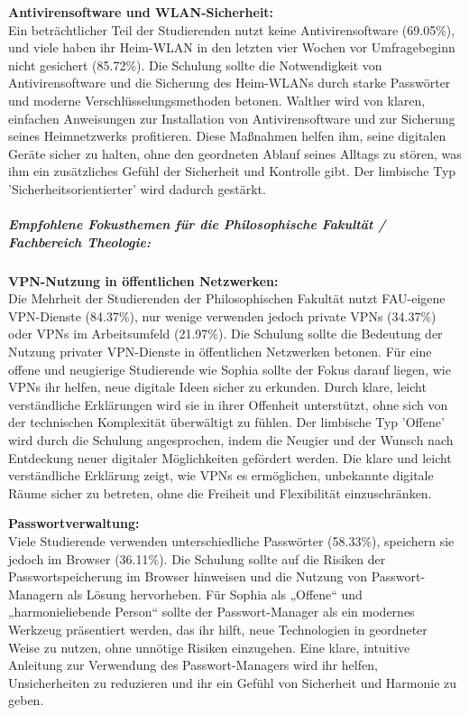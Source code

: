 \documentclass[german,report]{i1thesis}
\begin{document}
\textbf{Antivirensoftware und WLAN-Sicherheit:}\\
Ein beträchtlicher Teil der Studierenden nutzt keine Antivirensoftware (69.05\%), und viele haben ihr Heim-WLAN in den letzten vier Wochen vor Umfragebeginn nicht gesichert (85.72\%). Die Schulung sollte die Notwendigkeit von Antivirensoftware und die Sicherung des Heim-WLANs durch starke Passwörter und moderne Verschlüsselungsmethoden betonen. Walther wird von klaren, einfachen Anweisungen zur Installation von Antivirensoftware und zur Sicherung seines Heimnetzwerks profitieren. Diese Maßnahmen helfen ihm, seine digitalen Geräte sicher zu halten, ohne den geordneten Ablauf seines Alltags zu stören, was ihm ein zusätzliches Gefühl der Sicherheit und Kontrolle gibt. Der limbische Typ 'Sicherheitsorientierter' wird dadurch gestärkt.

\subparagraph{Empfohlene Fokusthemen für die Philosophische Fakultät / Fachbereich Theologie:} 
\mbox{}

\textbf{VPN-Nutzung in öffentlichen Netzwerken:}\\
Die Mehrheit der Studierenden der Philosophischen Fakultät nutzt FAU-eigene VPN-Dienste (84.37\%), nur wenige verwenden jedoch private VPNs (34.37\%) oder VPNs im Arbeitsumfeld (21.97\%). Die Schulung sollte die Bedeutung der Nutzung privater VPN-Dienste in öffentlichen Netzwerken betonen. Für eine offene und neugierige Studierende wie Sophia sollte der Fokus darauf liegen, wie VPNs ihr helfen, neue digitale Ideen sicher zu erkunden. Durch klare, leicht verständliche Erklärungen wird sie in ihrer Offenheit unterstützt, ohne sich von der technischen Komplexität überwältigt zu fühlen. Der limbische Typ 'Offene' wird durch die Schulung angesprochen, indem die Neugier und der Wunsch nach Entdeckung neuer digitaler Möglichkeiten gefördert werden. Die klare und leicht verständliche Erklärung zeigt, wie VPNs es ermöglichen, unbekannte digitale Räume sicher zu betreten, ohne die Freiheit und Flexibilität einzuschränken.

\textbf{Passwortverwaltung:}\\
Viele Studierende verwenden unterschiedliche Passwörter (58.33\%), speichern sie jedoch im Browser (36.11\%). Die Schulung sollte auf die Risiken der Passwortspeicherung im Browser hinweisen und die Nutzung von Passwort-Managern als Lösung hervorheben. Für Sophia als „Offene“ und „harmonieliebende Person“ sollte der Passwort-Manager als ein modernes Werkzeug präsentiert werden, das ihr hilft, neue Technologien in geordneter Weise zu nutzen, ohne unnötige Risiken einzugehen. Eine klare, intuitive Anleitung zur Verwendung des Passwort-Managers wird ihr helfen, Unsicherheiten zu reduzieren und ihr ein Gefühl von Sicherheit und Harmonie zu geben.
\end{document}
